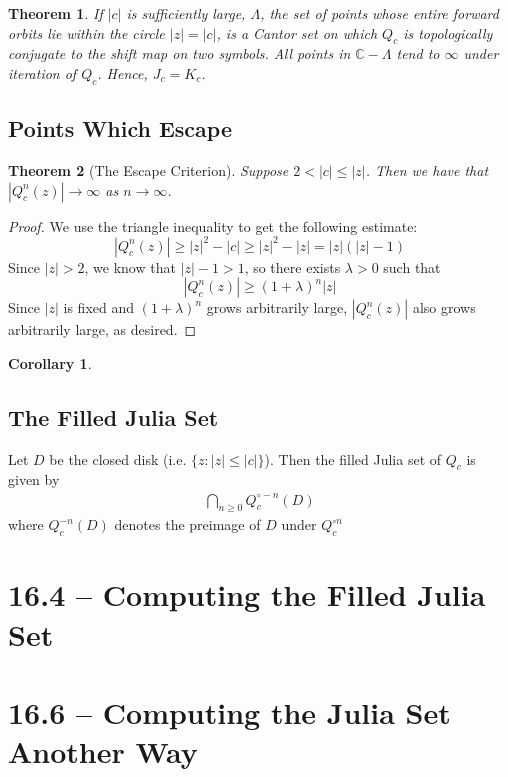 \documentclass[symmetric]{tufte-handout}
\newtheorem{theorem}{Theorem}
\newtheorem{corollary}{Corollary}
\begin{document}
\begin{theorem}
If $|c|$ is sufficiently large, $\Lambda$, the set of points whose entire forward orbits lie within the circle $|z|=|c|$, is a Cantor set on which $Q_c$ is topologically conjugate to the shift map on two symbols. All points in $\mathbb{C} - \Lambda$ tend to $\infty$ under iteration of $Q_c$. Hence, $J_c=K_c$.
\end{theorem}



\subsection{Points Which Escape}



\begin{theorem}[The Escape Criterion]
Suppose $2 < |c| \le |z|$. Then we have that $|Q_c^n(z)| \rightarrow \infty$ as $n \rightarrow \infty$.

\end{theorem}
\begin{proof}
We use the triangle inequality to get the following estimate:
\begin{equation}
    |Q_c^n(z)| \geq |z|^2 - |c| \geq |z|^2 - |z| = |z|(|z|-1)
\end{equation}
Since $|z| > 2$, we know that $|z|-1>1$, so there exists $\lambda > 0$ such that 
\begin{equation}
    |Q_c^n(z)| \geq (1+\lambda)^n|z|
\end{equation}
Since $|z|$ is fixed and $(1+\lambda)^n$ grows arbitrarily large, $|Q_c^n(z)|$ also grows arbitrarily large, as desired.

\end{proof}



\begin{corollary}

\end{corollary}



\subsection{The Filled Julia Set}

Let $D$ be the closed disk (i.e. $\{z : |z| \le |c|\}$). Then the filled Julia set of $Q_c$ is given by
\begin{align*}
\bigcap\limits_{n\ge 0} Q_c^{\circ -n} (D)
\end{align*}
where $Q_c^{-n} (D)$ denotes the preimage of $D$ under $Q_c^{\circ n}$



\section{16.4 -- Computing the Filled Julia Set}\label{sec:problem-1}










\section{16.6 -- Computing the Julia Set Another Way}\label{sec:problem-1}
\end{document}
